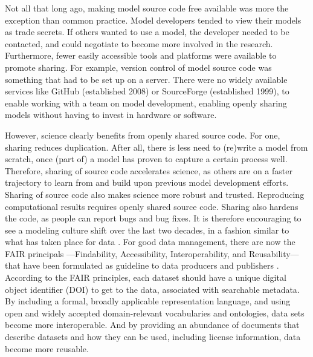 \documentclass[12pt]{amsart}
\begin{document}
Not all that long ago, making model source code free available was more the exception than common practice. Model developers tended to view their models as trade secrets. If others wanted to use a model, the developer needed to be contacted, and could negotiate to become more involved in the research. Furthermore, fewer easily accessible tools and platforms were available to promote sharing. For example, version control of model source code was something that had to be set up on a server. There were no widely available services like GitHub (established 2008) or SourceForge (established 1999), to enable working with a team on model development, enabling openly sharing models without having to invest in hardware or software.

However, science clearly benefits from openly shared source code. For one, sharing reduces duplication. After all, there is less need to (re)write a model from scratch, once (part of) a model has proven to capture a certain process well. Therefore, sharing of source code accelerates science, as others are on a faster trajectory to learn from and build upon previous model development efforts. Sharing of source code also makes science more robust and trusted. Reproducing computational results requires openly shared source code. Sharing also hardens the code, as people can report bugs and bug fixes. It is therefore encouraging to see a modeling culture shift over the last two decades, in a fashion similar to what has taken place for data \citep[e.g.,][]{hsu2015data}. For good data management, there are now the FAIR principals ---Findability, Accessibility, Interoperability, and Reusability---that have been formulated as guideline to data producers and publishers \citep{wilkinson2016fair}. According to the FAIR principles, each dataset should have a unique digital object identifier (DOI) to get to the data, associated with searchable metadata. By including a formal, broadly applicable representation language, and using open and widely accepted domain-relevant vocabularies and ontologies, data sets become more interoperable. And by providing an abundance of documents that describe datasets and how they can be used, including license information, data become more reusable.
\end{document}
